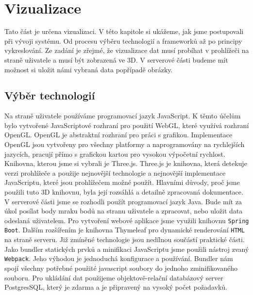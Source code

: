 \documentclass[czech,bachelor,dept420,male,cpdeclaration]{diploma}
\begin{document}
\section{Vizualizace}
Tato část je určena vizualizaci. V této kapitole si ukážeme, jak jsme postupovali při vývoji systému. Od procesu výběru technologií a frameworků až po principy vykreslování. Ze zadání je zřejmé, že vizualizace dat musí probíhat v prohlížeči na straně uživatele a musí být zobrazená ve 3D. V serverové části budeme mít možnost si uložit námi vybraná data popřípadě obrázky.

\subsection{Výběr technologií} 
Na straně uživatele používáme programovací jazyk JavaScript. K těmto účelům bylo vytvořené JavaScriptové rozhraní pro použití WebGL, které využívá rozhraní OpenGL. OpenGL je abstraktní rozhraní pro práci s grafikou. Implementace OpenGL jsou vytvořeny pro všechny platformy a naprogramovány na rychlejších jazycích, pracují přímo s grafickou kartou pro vysokou výpočetní rychlost. Knihovna, kterou jsme si vybrali je Three.js. Three.js je knihovna, která detekuje verzi prohlížeče a použije nejnovější technologie a nejnovější implementace JavaScriptu, které jsou prohlížečem možné použít. Hlavními důvody, proč jsme použili tuto 3D knihovnu, byla její rozsáhlá a detailně zpracovaná dokumentace. 
V serverové části jsme se rozhodli použít programovací jazyk Java. Bude mít za úkol posílat body mraku bodů na stranu uživatele a zpracovat, nebo uložit data odeslaná uživatelem. Pro vytvoření webové aplikace jsme využili knihovnu \texttt{Spring Boot}. Dalším rozšířením je knihovna Thymeleaf  pro dynamické renderování \texttt{HTML} na straně serveru. Již zmíněné technologie jsou nedílnou součástí praktické části. Jako bundler statických prvků a minifikaci JavaScriptu jsme použili nástroj zvaný \texttt{Webpack}. Jeho výhodou je jednoduchá konfigurace a používání. Bundler nám spojí všechny potřebné použité javascript soubory do jednoho zminifikovaného souboru. Pro ukládání dat použijeme objektově-relační databázový server PostgresSQL, který je zdarma a je připravený na vysoký počet požadavků.
 
\end{document}
